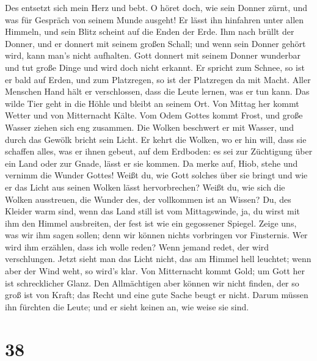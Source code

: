  Des entsetzt sich mein Herz und bebt.  O
höret doch, wie sein Donner zürnt, und was für Gespräch von seinem Munde
ausgeht!  Er lässt ihn hinfahren unter allen Himmeln, und
sein Blitz scheint auf die Enden der Erde.  Ihm nach
brüllt der Donner, und er donnert mit seinem großen Schall; und wenn
sein Donner gehört wird, kann man's nicht aufhalten.  Gott
donnert mit seinem Donner wunderbar und tut große Dinge und wird doch
nicht erkannt.  Er spricht zum Schnee, so ist er bald auf
Erden, und zum Platzregen, so ist der Platzregen da mit Macht.
 Aller Menschen Hand hält er verschlossen, dass die Leute
lernen, was er tun kann.  Das wilde Tier geht in die Höhle
und bleibt an seinem Ort.  Von Mittag her kommt Wetter und
von Mitternacht Kälte.  Vom Odem Gottes kommt Frost, und
große Wasser ziehen sich eng zusammen.  Die Wolken
beschwert er mit Wasser, und durch das Gewölk bricht sein Licht.
 Er kehrt die Wolken, wo er hin will, dass sie schaffen
alles, was er ihnen gebeut, auf dem Erdboden:  es sei zur
Züchtigung über ein Land oder zur Gnade, lässt er sie kommen.
 Da merke auf, Hiob, stehe und vernimm die Wunder Gottes!
 Weißt du, wie Gott solches über sie bringt und wie er
das Licht aus seinen Wolken lässt hervorbrechen?  Weißt
du, wie sich die Wolken ausstreuen, die Wunder des, der vollkommen ist
an Wissen?  Du, des Kleider warm sind, wenn das Land
still ist vom Mittagswinde,  ja, du wirst mit ihm den
Himmel ausbreiten, der fest ist wie ein gegossener Spiegel.
 Zeige uns, was wir ihm sagen sollen; denn wir können
nichts vorbringen vor Finsternis.  Wer wird ihm erzählen,
dass ich wolle reden? Wenn jemand redet, der wird verschlungen.
 Jetzt sieht man das Licht nicht, das am Himmel hell
leuchtet; wenn aber der Wind weht, so wird's klar.  Von
Mitternacht kommt Gold; um Gott her ist schrecklicher Glanz.
 Den Allmächtigen aber können wir nicht finden, der so
groß ist von Kraft; das Recht und eine gute Sache beugt er nicht.
 Darum müssen ihn fürchten die Leute; und er sieht keinen
an, wie weise sie sind.

\hypertarget{section-37}{%
\section{38}\label{section-37}}

